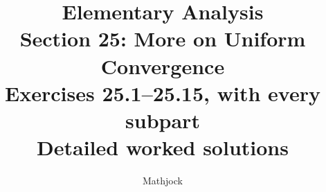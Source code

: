 
\title{\textbf{Elementary Analysis}\\[0.3em]
Section 25: More on Uniform Convergence\\[0.4em]
\large Exercises 25.1--25.15, with every subpart\\
Detailed worked solutions}
\author{Mathjock}
\date{}

\maketitle
\bookinfo
\tableofcontents
\clearpage
\setcounter{section}{24}


